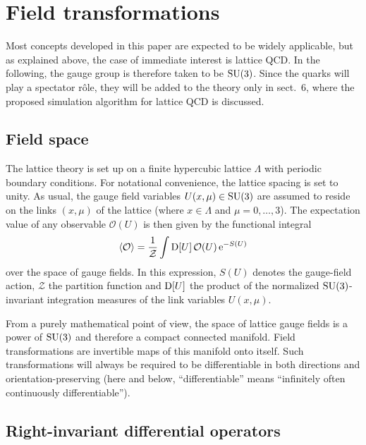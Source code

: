 \section{Field transformations}

Most concepts developed in this paper
are expected to be widely applicable, but as explained above,
the case of immediate interest is lattice QCD.
In the following, the gauge group is therefore taken to
be $\mathrm{SU}(3)$.
Since the quarks will play a spectator r\^ole,
they will be added to the theory only in sect.~6, where the proposed
simulation algorithm for lattice QCD is discussed.

\subsection{Field space}

The lattice theory is set up on a finite
hypercubic lattice $\Lambda$ with periodic boundary conditions.
For notational convenience, the lattice spacing is set to unity.
As usual, the gauge field variables $U(x,\mu)\in\mathrm{SU}(3)$
are assumed to
reside on the links $(x,\mu)$ of the lattice
(where $x\in\Lambda$ and $\mu=0,\ldots,3$).
The expectation value of any observable
$\mathcal{O}(U)$ is then given by the functional integral
\begin{equation}
  \langle\mathcal{O}\rangle=
  \frac{1}{\mathcal{Z}}\int\mathrm{D}[U]\,\mathcal{O}(U)\,\mathrm{e}^{-S(U)}
\end{equation}
over the space of gauge fields. In this expression,
$S(U)$ denotes the gauge-field action,
$\mathcal{Z}$ the partition function and
$\mathrm{D}[U]$ the product of the normalized
$\mathrm{SU}(3)$-invariant integration measures of the link variables
$U(x,\mu)$.

From a purely mathematical point of view, the space of
lattice gauge fields
is a power of $\mathrm{SU}(3)$ and therefore a compact connected manifold.
Field transformations
are invertible maps of this manifold onto itself.
Such transformations will always be required to be
differentiable
in both directions and orientation-preserving
(here and below, ``differentiable'' means
``infinitely often continuously differentiable'').


\subsection{Right-invariant differential operators}

